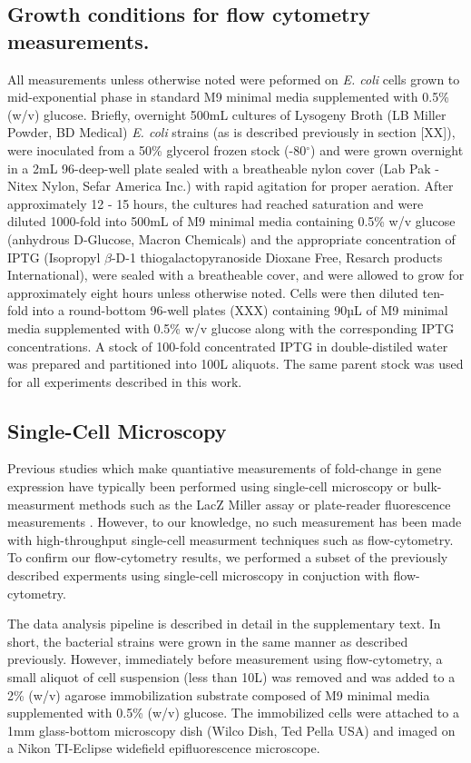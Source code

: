 \subsection*{Growth conditions for flow cytometry measurements.}
All measurements unless otherwise noted were peformed on \textit{E. coli} cells
grown to mid-exponential phase in standard M9 minimal media supplemented with
0.5\% (w/v) glucose. Briefly, overnight 500mL cultures of Lysogeny Broth (LB
Miller Powder, BD Medical) \textit{E. coli} strains (as is described previously
in section [XX]), were inoculated from a 50\% glycerol frozen stock
(-80$^\circ$) and were grown overnight in a 2mL 96-deep-well plate sealed with
a breatheable nylon cover (Lab Pak - Nitex Nylon, Sefar America Inc.) with
rapid agitation for proper aeration. After approximately 12 - 15 hours, the
cultures had reached saturation and were diluted 1000-fold into 500mL of M9
minimal media containing 0.5\% w/v glucose (anhydrous D-Glucose, Macron
Chemicals) and the appropriate concentration of IPTG (Isopropyl $\beta$-D-1
thiogalactopyranoside Dioxane Free, Resarch products International), were
sealed with a breatheable cover, and were allowed to grow for approximately
eight hours unless otherwise noted. Cells were then diluted ten-fold into a
round-bottom 96-well plates (XXX) containing 90µL of M9 minimal media
supplemented with 0.5\% w/v glucose along with the corresponding IPTG
concentrations. A stock of 100-fold concentrated IPTG in double-distiled water
was prepared and partitioned into 100\textmu L aliquots. The same parent stock
was used for all experiments described in this work.

\subsection*{Single-Cell Microscopy}
Previous studies which make quantiative measurements of fold-change in gene
expression have typically been performed using single-cell microscopy
\cite{Brewster2014, Jones2014} or bulk-measurment methods such as the LacZ
Miller assay or plate-reader fluorescence measurements \cite{Garcia2011,
Razo-Mejia2014}. However, to our knowledge, no such measurement has been made
with high-throughput single-cell  measurment techniques such as flow-cytometry.
To confirm our flow-cytometry results, we performed a subset of the previously
described experments using  single-cell microscopy in conjuction with flow-
cytometry.

The data analysis pipeline is described in detail in the supplementary text. In
short, the bacterial strains were grown in the same manner as described
previously. However, immediately before measurement using flow-cytometry, a
small aliquot of cell suspension (less than 10\textmu L) was removed and was
added to a 2\% (w/v) agarose immobilization substrate composed of M9 minimal
media supplemented with 0.5\% (w/v) glucose. The immobilized cells were
attached to a 1mm glass-bottom microscopy dish (Wilco Dish, Ted Pella USA) and
imaged on a Nikon TI-Eclipse widefield epifluorescence microscope.

